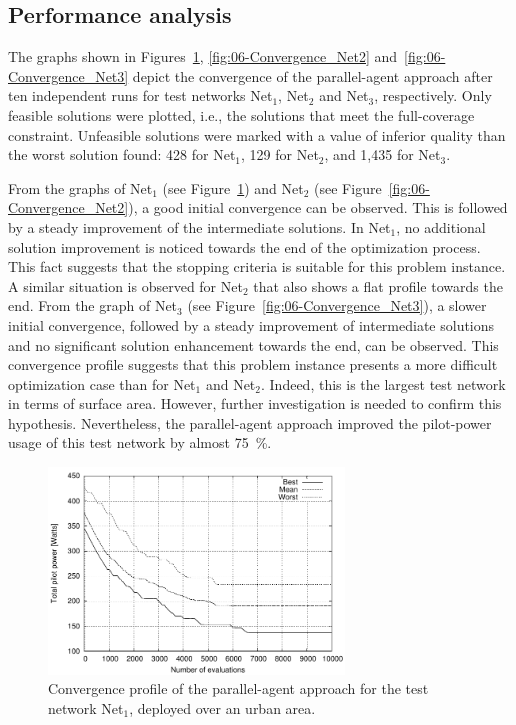 \subsection{Performance analysis}

The graphs shown in Figures~\ref{fig:06-Convergence_Net1}, \ref{fig:06-Convergence_Net2}
and~\ref{fig:06-Convergence_Net3} depict the convergence of the
parallel-agent approach after ten independent runs for test networks
Net$_{1}$, Net$_{2}$ and Net$_{3}$, respectively. Only feasible
solutions were plotted, i.e., the solutions that meet the full-coverage
constraint. Unfeasible solutions were marked with a value of inferior
quality than the worst solution found: 428 for Net$_{1}$, 129 for
Net$_{2}$, and 1,435 for Net$_{3}$.

From the graphs of Net$_{1}$ (see Figure~\ref{fig:06-Convergence_Net1})
and Net$_{2}$ (see Figure~\ref{fig:06-Convergence_Net2}), a good
initial convergence can be observed. This is followed by a steady
improvement of the intermediate solutions. In Net$_{1}$, no additional
solution improvement is noticed towards the end of the optimization
process. This fact suggests that the stopping criteria is suitable
for this problem instance. A similar situation is observed for Net$_{2}$
that also shows a flat profile towards the end. From the graph of
Net$_{3}$ (see Figure~\ref{fig:06-Convergence_Net3}), a slower
initial convergence, followed by a steady improvement of intermediate
solutions and no significant solution enhancement towards the end,
can be observed. This convergence profile suggests that this problem
instance presents a more difficult optimization case than for Net$_{1}$
and Net$_{2}$. Indeed, this is the largest test network in terms
of surface area. However, further investigation is needed to confirm
this hypothesis. Nevertheless, the parallel-agent approach improved
the pilot-power usage of this test network by almost 75~\%.

\begin{figure}[h]
\centering

\includegraphics[width=0.7\textwidth]{06-experimental_evaluation-service_coverage/img/convergence_first}

\caption{Convergence profile of the parallel-agent approach for the test network
Net$_{1}$, deployed over an urban area.\emph{\label{fig:06-Convergence_Net1}}}
\end{figure}


